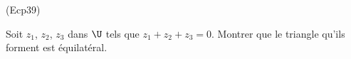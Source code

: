 \begin{tiny}(Ecp39)\end{tiny} Soit $z_1$, $z_2$, $z_3$ dans $\U$ tels que $z_1+z_2+z_3 = 0$. Montrer que le triangle qu'ils forment est équilatéral.
